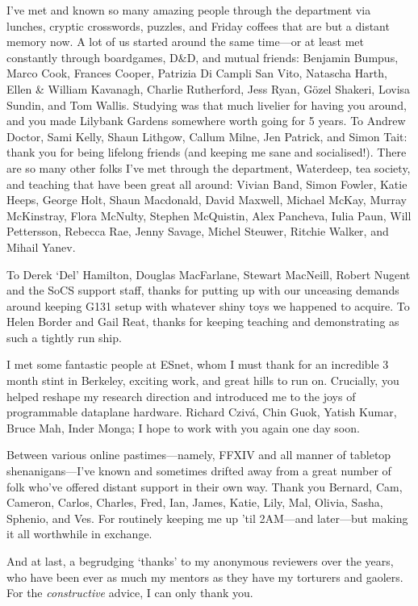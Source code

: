I've met and known so many amazing people through the department via lunches, cryptic crosswords, puzzles, and Friday coffees that are but a distant memory now.
A lot of us started around the same time---or at least met constantly through boardgames, D\&D, and mutual friends: Benjamin Bumpus, Marco Cook, Frances Cooper, Patrizia Di Campli San Vito, Natascha Harth, Ellen \& William Kavanagh, Charlie Rutherford, Jess Ryan, G\"{o}zel Shakeri, Lovisa Sundin, and Tom Wallis.
Studying was that much livelier for having you around, and you made Lilybank Gardens somewhere worth going for 5 years.
To Andrew Doctor, Sami Kelly, Shaun Lithgow, Callum Milne, Jen Patrick, and Simon Tait: thank you for being lifelong friends (and keeping me sane and socialised!).
There are so many other folks I've met through the department, Waterdeep, tea society, and teaching that have been great all around: Vivian Band, Simon Fowler, Katie Heeps, George Holt, Shaun Macdonald, David Maxwell, Michael McKay, Murray McKinstray, Flora McNulty, Stephen McQuistin, Alex Pancheva, Iulia Paun, Will Pettersson, Rebecca Rae, Jenny Savage, Michel Steuwer, Ritchie Walker, and Mihail Yanev.

To Derek `Del' Hamilton, Douglas MacFarlane, Stewart MacNeill, Robert Nugent and the SoCS support staff, thanks for putting up with our unceasing demands around keeping G131 setup with whatever shiny toys we happened to acquire.
To Helen Border and Gail Reat, thanks for keeping teaching and demonstrating as such a tightly run ship.

I met some fantastic people at ESnet, whom I must thank for an incredible 3 month stint in Berkeley, exciting work, and great hills to run on.
Crucially, you helped reshape my research direction and introduced me to the joys of programmable dataplane hardware.
Richard Cziv\'{a}, Chin Guok, Yatish Kumar, Bruce Mah, Inder Monga; I hope to work with you again one day soon.

Between various online pastimes---namely, FFXIV and all manner of tabletop shenanigans---I've known and sometimes drifted away from a great number of folk who've offered distant support in their own way.
Thank you Bernard, Cam, Cameron, Carlos, Charles, Fred, Ian, James, Katie, Lily, Mal, Olivia, Sasha, Sphenio, and Ves.
For routinely keeping me up 'til 2AM---and later---but making it all worthwhile in exchange.

And at last, a begrudging `thanks' to my anonymous reviewers over the years, who have been ever as much my mentors as they have my torturers and gaolers.
For the \emph{constructive} advice, I can only thank you.
